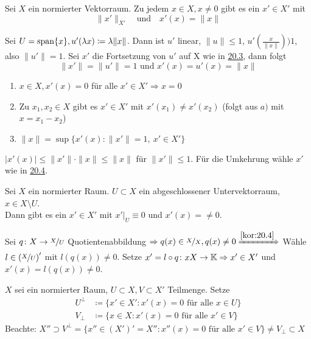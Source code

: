 \begin{kor} \label{kor:20.4}
	Sei $X$ ein normierter Vektorraum. Zu jedem $x \in X, x \neq 0$ gibt es ein $x' \in X'$ mit 
		\[ \| x' \|_{X'} \quad \text{und} \quad x'(x) = \| x \| \]
\end{kor}

\begin{beweis}
	Sei $U = \operatorname{span} \{ x \}, u'( \lambda x) \coloneqq \lambda \| x \|$. Dann ist $u'$ linear, $\| u \| \leq 1$, $u'(\frac{x}{\| x \|}) ) 1$, also $\| u' \| = 1$. Sei $x'$ die Fortsetzung von $u'$ auf X wie in \hyperref[satz:20.3-Hahn-Banach]{20.3}, dann folgt
	\[ \| x' \| = \| u' \| = 1 \text{ und } x'(x) = u'(x) = \| x \| \]
\end{beweis}


\begin{folgerung}
	\begin{enumerate}[label=\alph*\upshape)]
		\item $x \in X, x'(x) = 0$ für alle $x' \in X' \Rightarrow x = 0$
		\item Zu $x_{1}, x_{2} \in X$ gibt es $x' \in X'$ mit $x'(x_{1}) \neq x'(x_{2})$ (folgt aus $a)$ mit $x = x_{1} - x_{2}$)
		\item $\| x \| = \sup \{ x'(x) : \| x' \| = 1, ~ x' \in X' \}$
	\end{enumerate}	
\end{folgerung}

\begin{beweis}
	$|x'(x) | \leq \| x' \| \cdot \| x \| \leq \| x \|$ für $\| x' \| \leq 1$.
	Für die Umkehrung wähle $x'$ wie in \hyperref[kor:20.4]{20.4}.
\end{beweis}


\begin{kor} \label{kor:20.6}
	Sei $X$ ein normierter Raum. $U \subset X$ ein abgeschlossener Untervektorraum, $x \in X \setminus U$. \\
	Dann gibt es ein $x' \in X'$ mit $x'|_{U} \equiv 0$ und $x'(x) =\neq 0$.	
\end{kor}

\begin{beweis}
	Sei $q \colon X \rightarrow \nicefrac{X}{U}$ Quotientenabbildung $\Rightarrow q(x) \in \nicefrac{X}{X}, q(x) \neq 0 \xRightarrow[]{\ref{kor:20.4}}$ Wähle $l \in \left(\nicefrac{X}{U}\right)'$ mit $l(q(x)) \neq 0$. Setze $x' = l \circ q \colon xX\rightarrow \mathbb{K} \Rightarrow x' \in X'$ und $x'(x) = l(q(x)) \neq 0$.
\end{beweis}


\begin{definition}
	$X$ sei ein normierter Raum, $U \subset X, V \subset X'$ Teilmenge. Setze
	\begin{align*}
		U^{\bot} & \coloneqq \{ x' \in X' : x'(x) = 0 \text{ für alle } x \in U \} \\
		V_{\bot} & \coloneqq \{ x \in X : x'(x) = 0 \text{ für alle } x' \in V \} 
	\end{align*}
	Beachte: $X'' \supset V^{\bot} = \{  x'' \in \left( X' \right)' = X'' : x''(x) = 0 \text{ für alle } x' \in V \} \neq V_{\bot} \subset X$
\end{definition}


